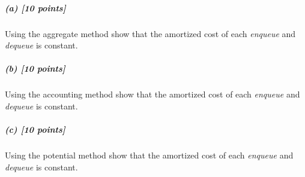 \documentclass[11pt]{article}
\begin{document}
\subparagraph{(a) [10 points]}
Using the aggregate method show that the amortized cost of each {\em enqueue} and {\em dequeue} is constant.



\subparagraph{(b) [10 points]}
Using the accounting method show that the amortized cost of each {\em enqueue} and {\em dequeue} is constant.



\subparagraph{(c) [10 points]}
Using the potential method show that the amortized cost of each {\em enqueue} and {\em dequeue} is constant.


\end{document}
